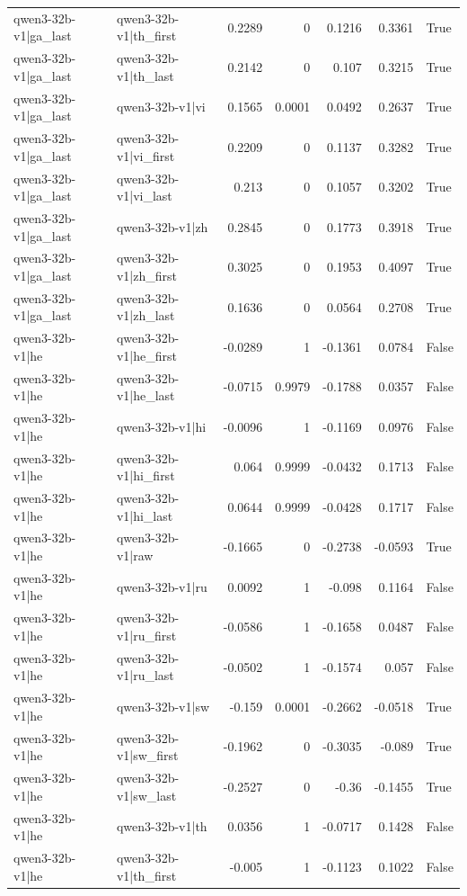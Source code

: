 \begin{table}
\begin{tabular}{l l r r r r l}
qwen3-32b-v1|ga_last & qwen3-32b-v1|th_first & 0.2289 & 0 & 0.1216 & 0.3361 & True \\
qwen3-32b-v1|ga_last & qwen3-32b-v1|th_last & 0.2142 & 0 & 0.107 & 0.3215 & True \\
qwen3-32b-v1|ga_last & qwen3-32b-v1|vi & 0.1565 & 0.0001 & 0.0492 & 0.2637 & True \\
qwen3-32b-v1|ga_last & qwen3-32b-v1|vi_first & 0.2209 & 0 & 0.1137 & 0.3282 & True \\
qwen3-32b-v1|ga_last & qwen3-32b-v1|vi_last & 0.213 & 0 & 0.1057 & 0.3202 & True \\
qwen3-32b-v1|ga_last & qwen3-32b-v1|zh & 0.2845 & 0 & 0.1773 & 0.3918 & True \\
qwen3-32b-v1|ga_last & qwen3-32b-v1|zh_first & 0.3025 & 0 & 0.1953 & 0.4097 & True \\
qwen3-32b-v1|ga_last & qwen3-32b-v1|zh_last & 0.1636 & 0 & 0.0564 & 0.2708 & True \\
qwen3-32b-v1|he & qwen3-32b-v1|he_first & -0.0289 & 1 & -0.1361 & 0.0784 & False \\
qwen3-32b-v1|he & qwen3-32b-v1|he_last & -0.0715 & 0.9979 & -0.1788 & 0.0357 & False \\
qwen3-32b-v1|he & qwen3-32b-v1|hi & -0.0096 & 1 & -0.1169 & 0.0976 & False \\
qwen3-32b-v1|he & qwen3-32b-v1|hi_first & 0.064 & 0.9999 & -0.0432 & 0.1713 & False \\
qwen3-32b-v1|he & qwen3-32b-v1|hi_last & 0.0644 & 0.9999 & -0.0428 & 0.1717 & False \\
qwen3-32b-v1|he & qwen3-32b-v1|raw & -0.1665 & 0 & -0.2738 & -0.0593 & True \\
qwen3-32b-v1|he & qwen3-32b-v1|ru & 0.0092 & 1 & -0.098 & 0.1164 & False \\
qwen3-32b-v1|he & qwen3-32b-v1|ru_first & -0.0586 & 1 & -0.1658 & 0.0487 & False \\
qwen3-32b-v1|he & qwen3-32b-v1|ru_last & -0.0502 & 1 & -0.1574 & 0.057 & False \\
qwen3-32b-v1|he & qwen3-32b-v1|sw & -0.159 & 0.0001 & -0.2662 & -0.0518 & True \\
qwen3-32b-v1|he & qwen3-32b-v1|sw_first & -0.1962 & 0 & -0.3035 & -0.089 & True \\
qwen3-32b-v1|he & qwen3-32b-v1|sw_last & -0.2527 & 0 & -0.36 & -0.1455 & True \\
qwen3-32b-v1|he & qwen3-32b-v1|th & 0.0356 & 1 & -0.0717 & 0.1428 & False \\
qwen3-32b-v1|he & qwen3-32b-v1|th_first & -0.005 & 1 & -0.1123 & 0.1022 & False \\

\end{tabular}
\end{table}
